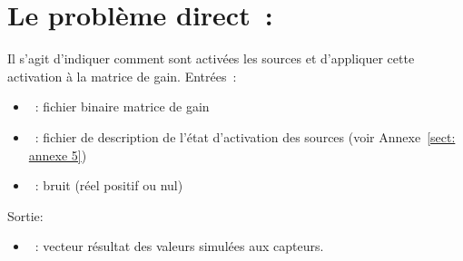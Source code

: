 \medskip

\noindent
{}


\section{Le problème direct~:}
\label{sect: command direct}

Il s'agit d'indiquer comment sont activées les sources et d'appliquer cette activation à la matrice de gain. 
Entrées~: 
\begin{itemize}
    \item {}~: fichier binaire matrice de gain
    \item {}~: fichier de description de l'état d'activation des sources (voir Annexe~\ref{sect: annexe 5})
    \item {}~: bruit (réel positif ou nul)
\end{itemize}
Sortie:
\begin{itemize}
    \item {}~: vecteur résultat des valeurs simulées aux capteurs.
\end{itemize}

\medskip

\noindent
{}
